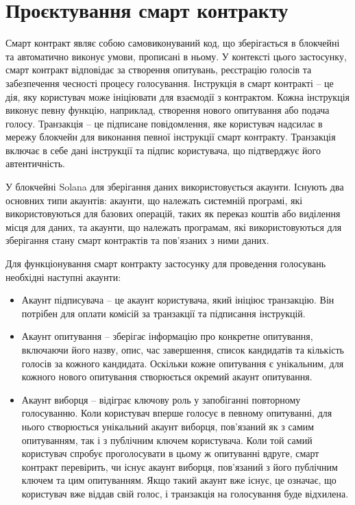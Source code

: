 \documentclass[14pt]{extreport}
\begin{document}
  \section{Проєктування смарт контракту}
  
  Смарт контракт являє собою самовиконуваний код, що зберігається в блокчейні та автоматично виконує умови, прописані в ньому. У контексті цього застосунку, смарт контракт відповідає за створення опитувань, реєстрацію голосів та забезпечення чесності процесу голосування. Інструкція в смарт контракті – це дія, яку користувач може ініціювати для взаємодії з контрактом. Кожна інструкція виконує певну функцію, наприклад, створення нового опитування або подача голосу. Транзакція – це підписане повідомлення, яке користувач надсилає в мережу блокчейн для виконання певної інструкції смарт контракту. Транзакція включає в себе дані інструкції та підпис користувача, що підтверджує його автентичність.
  
  У блокчейні Solana для зберігання даних використовується акаунти. Існують два основних типи акаунтів: акаунти, що належать системній програмі, які використовуються для базових операцій, таких як переказ коштів або виділення місця для даних, та акаунти, що належать програмам, які використовуються для зберігання стану смарт контрактів та пов'язаних з ними даних.
  
  Для функціонування смарт контракту застосунку для проведення голосувань необхідні наступні акаунти:
  
  \begin{itemize}
    \item Акаунт підписувача – це акаунт користувача, який ініціює транзакцію. Він потрібен для оплати комісій за транзакції та підписання інструкцій.
    \item Акаунт опитування – зберігає інформацію про конкретне опитування, включаючи його назву, опис, час завершення, список кандидатів та кількість голосів за кожного кандидата. Оскільки кожне опитування є унікальним, для кожного нового опитування створюється окремий акаунт опитування.
    \item Акаунт виборця – відіграє ключову роль у запобіганні повторному голосуванню. Коли користувач вперше голосує в певному опитуванні, для нього створюється унікальний акаунт виборця, пов'язаний як з самим опитуванням, так і з публічним ключем користувача. Коли той самий користувач спробує проголосувати в цьому ж опитуванні вдруге, смарт контракт перевірить, чи існує акаунт виборця, пов'язаний з його публічним ключем та цим опитуванням. Якщо такий акаунт вже існує, це означає, що користувач вже віддав свій голос, і транзакція на голосування буде відхилена.
  \end{itemize}
  
\end{document}
